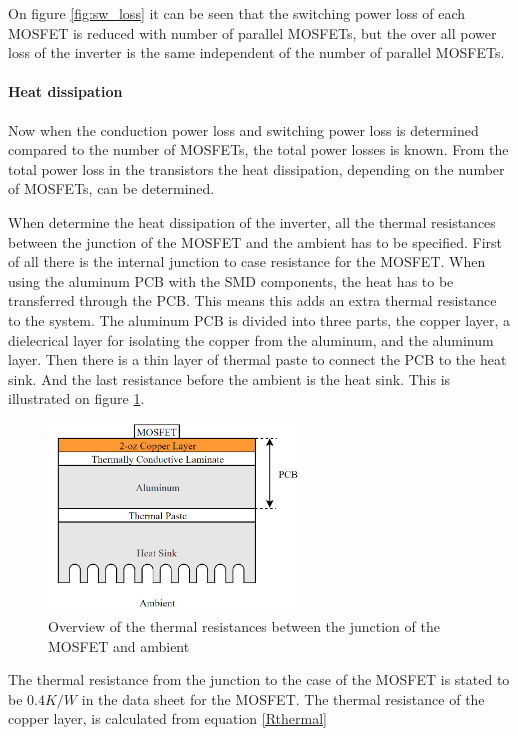 On figure \ref{fig:sw_loss} it can be seen that the switching power loss of each MOSFET is reduced with number of parallel MOSFETs, but the over all power loss of the inverter is the same independent of the number of parallel MOSFETs.

\paragraph{Heat dissipation}
Now when the conduction power loss and switching power loss is determined compared to the number of MOSFETs, the total power losses is known. From the total power loss in the transistors the heat dissipation, depending on the number of MOSFETs, can be determined.

When determine the heat dissipation of the inverter, all the thermal resistances between the junction of the MOSFET and the ambient has to be specified.
First of all there is the internal junction to case resistance for the MOSFET.
When using the aluminum PCB with the SMD components, the heat has to be transferred through the PCB. This means this adds an extra thermal resistance to the system. The aluminum PCB is divided into three parts, the copper layer, a dielecrical layer for isolating the copper from the aluminum, and the aluminum layer.
Then there is a thin layer of thermal paste to connect the PCB to the heat sink. And the last resistance before the ambient is the heat sink. This is illustrated on figure \ref{fig:thermal_overview}.

    \begin{figure}[H]
		\centering
		\includegraphics[width=0.6\textwidth]{pictures/hardware/Power_Board/Thermal_overview.png}
		\caption{Overview of the thermal resistances between the junction of the MOSFET and ambient}
		\label{fig:thermal_overview}
	\end{figure}
	
The thermal resistance from the junction to the case of the MOSFET is stated to be $0.4 K/W$ in the data sheet for the MOSFET.\cite{mosfet}
The thermal resistance of the copper layer, is calculated from equation \ref{Rthermal}

